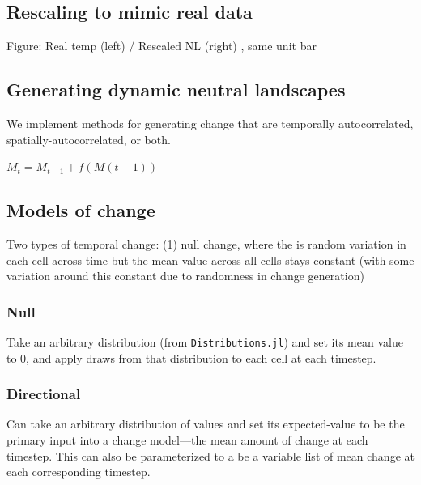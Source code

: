 \documentclass[11pt]{article}
\begin{document}
\hypertarget{rescaling-to-mimic-real-data}{%
\subsection{Rescaling to mimic real
data}\label{rescaling-to-mimic-real-data}}

Figure: Real temp (left) / Rescaled NL (right) , same unit bar

\hypertarget{generating-dynamic-neutral-landscapes}{%
\subsection{Generating dynamic neutral
landscapes}\label{generating-dynamic-neutral-landscapes}}

We implement methods for generating change that are temporally
autocorrelated, spatially-autocorrelated, or both.

\(M_t = M_{t-1} + f(M(t-1))\)

\hypertarget{models-of-change}{%
\subsection{Models of change}\label{models-of-change}}

Two types of temporal change: (1) null change, where the is random
variation in each cell across time but the mean value across all cells
stays constant (with some variation around this constant due to
randomness in change generation)

\hypertarget{null}{%
\subsubsection{Null}\label{null}}

Take an arbitrary distribution (from \texttt{Distributions.jl}) and set
its mean value to 0, and apply draws from that distribution to each cell
at each timestep.

\hypertarget{directional}{%
\subsubsection{Directional}\label{directional}}

Can take an arbitrary distribution of values and set its expected-value
to be the primary input into a change model---the mean amount of change
at each timestep. This can also be parameterized to a be a variable list
of mean change at each corresponding timestep.
\end{document}
